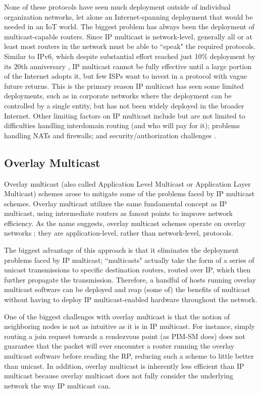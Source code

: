 None of these protocols have seen much deployment outside of individual organization networks, let alone an Internet-spanning deployment that would be needed in an IoT world. The biggest problem has always been the deployment of multicast-capable routers. Since IP multicast is network-level, generally all or at least most routers in the network must be able to ``speak" the required protocols. Similar to IPv6, which despite substantial effort reached just 10\% deployment by its 20th anniversary \cite{ArsTechnica}, IP multicast cannot be fully effective until a large portion of the Internet adopts it, but few ISPs want to invest in a protocol with vague future returns. This is the primary reason IP multicast has seen some limited deployments, such as in corporate networks where the deployment can be controlled by a single entity, but has not been widely deployed in the broader Internet. Other limiting factors on IP multicast include but are not limited to difficulties handling interdomain routing (and who will pay for it); problems handling NATs and firewalls; and security/authorization challenges \cite{MulticastProbs}.

\subsection{Overlay Multicast}
Overlay multicast (also called Application Level Multicast or Application Layer Multicast) schemes arose to mitigate some of the problems faced by IP multicast schemes. Overlay multicast utilizes the same fundamental concept as IP multicast, using intermediate routers as fanout points to improve network efficiency. As the name suggests, overlay multicast schemes operate on overlay networks \cite{overlay}; they are application-level, rather than network-level, protocols. 

The biggest advantage of this approach is that it eliminates the deployment problems faced by IP multicast; ``multicasts" actually take the form of a series of unicast transmissions to specific destination routers, routed over IP, which then further propagate the transmission. Therefore, a handful of hosts running overlay multicast software can be deployed and reap (some of) the benefits of multicast without having to deploy IP multicast-enabled hardware throughout the network.

One of the biggest challenges with overlay multicast is that the notion of neighboring nodes is not as intuitive as it is in IP multicast. For instance, simply routing a join request towards a rendezvous point (as PIM-SM does) does not guarantee that the packet will ever encounter a router running the overlay multicast software before reading the RP, reducing such a scheme to little better than unicast. In addition, overlay multicast is inherently less efficient than IP multicast because overlay multicast does not fully consider the underlying network the way IP multicast can.

